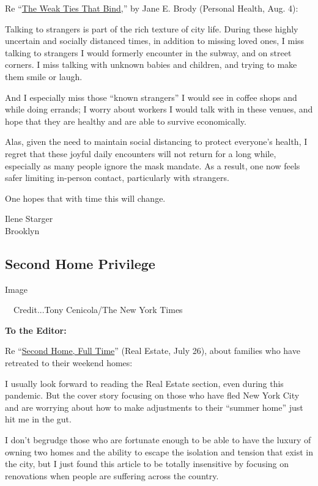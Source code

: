 Re
``\href{https://www.nytimes3xbfgragh.onion/2020/08/03/well/family/the-benefits-of-talking-to-strangers.html}{The
Weak Ties That Bind},'' by Jane E. Brody (Personal Health, Aug. 4):

Talking to strangers is part of the rich texture of city life. During
these highly uncertain and socially distanced times, in addition to
missing loved ones, I miss talking to strangers I would formerly
encounter in the subway, and on street corners. I miss talking with
unknown babies and children, and trying to make them smile or laugh.

And I especially miss those ``known strangers'' I would see in coffee
shops and while doing errands; I worry about workers I would talk with
in these venues, and hope that they are healthy and are able to survive
economically.

Alas, given the need to maintain social distancing to protect everyone's
health, I regret that these joyful daily encounters will not return for
a long while, especially as many people ignore the mask mandate. As a
result, one now feels safer limiting in-person contact, particularly
with strangers.

One hopes that with time this will change.

Ilene Starger\\
Brooklyn

\hypertarget{second-home-privilege}{%
\subsection{Second Home Privilege}\label{second-home-privilege}}

Image

~~Credit...Tony Cenicola/The New York Times

\textbf{To the Editor:}

Re
``\href{https://www.nytimes3xbfgragh.onion/2020/07/24/realestate/coronavirus-second-homes-.html}{Second
Home, Full Time}'' (Real Estate, July 26), about families who have
retreated to their weekend homes:

I usually look forward to reading the Real Estate section, even during
this pandemic. But the cover story focusing on those who have fled New
York City and are worrying about how to make adjustments to their
``summer home'' just hit me in the gut.

I don't begrudge those who are fortunate enough to be able to have the
luxury of owning two homes and the ability to escape the isolation and
tension that exist in the city, but I just found this article to be
totally insensitive by focusing on renovations when people are suffering
across the country.

